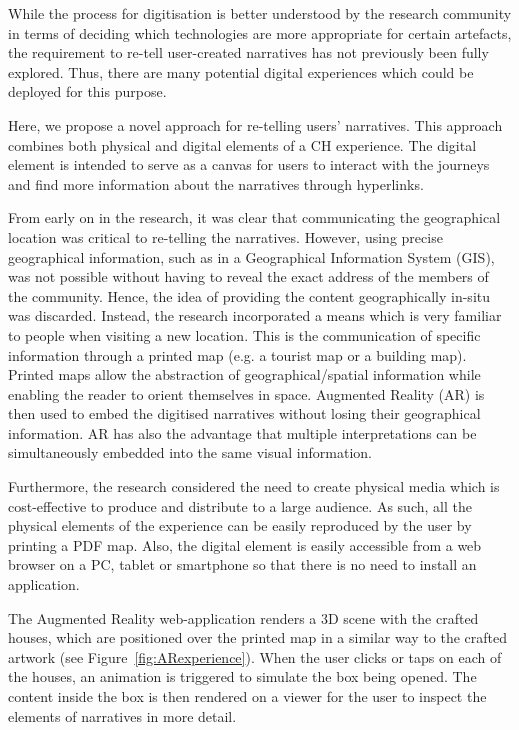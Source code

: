 \documentclass[acmlarge,screen,dvipsnames]{acmart}
\begin{document}
While the process for digitisation is better understood by the research
community in terms of deciding which technologies are more appropriate for certain artefacts, the requirement to re-tell user-created narratives has not previously been fully
explored. Thus, there are many potential digital experiences which could be
deployed for this purpose. 

Here, we propose a novel approach for re-telling users' narratives. This approach
combines both physical and digital elements of a CH experience. The digital element
is intended to serve as a canvas for users to interact with the journeys and
find more information about the narratives through hyperlinks. 

From early on in the research, it was clear that communicating the
geographical location was critical to re-telling the narratives. However,
using precise geographical information, such as in a Geographical Information
System (GIS), was not possible without having to reveal the exact address of the members of the community. Hence, the idea of providing the
content geographically in-situ was discarded. Instead, the research
incorporated a means which is very familiar to people when visiting a new
location. This is the communication of specific information through a printed
map (e.g. a tourist map or a building map). Printed maps allow the
abstraction of geographical/spatial information while enabling the reader to
orient themselves in space. Augmented Reality (AR) is then used to embed
the digitised narratives without losing their geographical information. AR has also the advantage that multiple interpretations can be simultaneously embedded into the same visual information. 

Furthermore, the research considered the need to create physical media which is
cost-effective to produce and distribute to a large audience. As such, all
the physical elements of the experience can be easily reproduced by the user by
printing a PDF map. Also, the digital element is easily accessible from a
web browser on a PC, tablet or smartphone so that there is no need to install an application. 

The Augmented Reality web-application renders a 3D scene with the crafted
houses, which are positioned over the printed map in a similar way to the
crafted artwork (see Figure~\ref{fig:ARexperience}). When the user clicks or
taps on each of the houses, an animation is triggered to simulate the box
being opened. The content inside the box is then rendered on a viewer for the
user to inspect the elements of narratives in more detail. 
\end{document}
